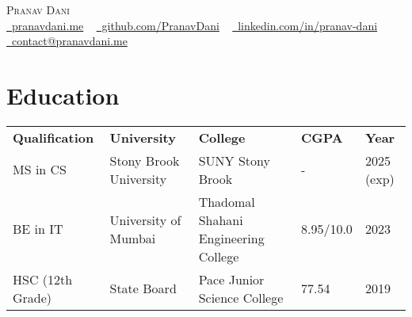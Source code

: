 \documentclass[letterpaper,11pt]{article}
\begin{document}

\begin{center}
    {\huge \scshape Pranav Dani} \\ \vspace{4pt}
    \small
    \faGlobe \href{https://pranavdani.me}{\raisebox{-0.1\height}\ pranavdani.me} ~
    \faGithub \href{https://github.com/PranavDani}{\raisebox{-0.2\height}\ github.com/PranavDani} ~
    \faLinkedin \href{https://linkedin.com/in/pranav-dani}{\raisebox{-0.2\height}\ linkedin.com/in/pranav-dani} ~
    \faEnvelope \href{mailto:contact@pranavdani.me}{\raisebox{-0.2\height}\  contact@pranavdani.me}
    \vspace{-10pt}
\end{center}


\section{Education}
    \vspace{-4pt}
    \begin{itemize}[leftmargin=0.2in, label={}]
        {\item{
            \begin{tabular}{ l@{\hskip 0.2in} l@{\hskip 0.2in} l@{\hskip 0.2in} l@{\hskip 0.2in} l }
                 \textbf{Qualification} & \textbf{University} & \textbf{College} & \textbf{CGPA} & \textbf{Year} \\
                 MS in CS & Stony Brook University & SUNY Stony Brook & - & 2025 (exp) \\
                 BE in IT & University of Mumbai & Thadomal Shahani Engineering College & 8.95/10.0 & 2023 \\
                 HSC (12th Grade) & State Board & Pace Junior Science College & 77.54 & 2019 
            \end{tabular}
        }}
    \end{itemize}
\vspace{-20pt}
\end{document}
